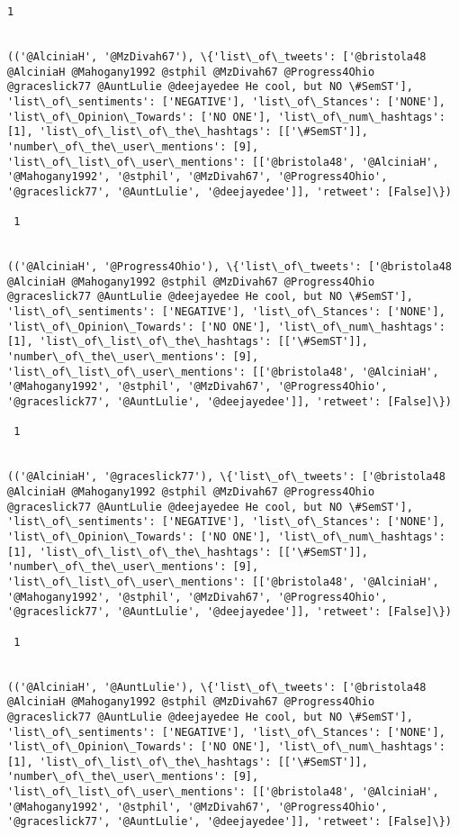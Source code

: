 \documentclass[11pt]{article}
\begin{document}
\begin{Verbatim}[commandchars=\\\{\}]
 1
 

(('@AlciniaH', '@MzDivah67'), \{'list\_of\_tweets': ['@bristola48 @AlciniaH @Mahogany1992 @stphil @MzDivah67 @Progress4Ohio @graceslick77 @AuntLulie @deejayedee He cool, but NO \#SemST'], 'list\_of\_sentiments': ['NEGATIVE'], 'list\_of\_Stances': ['NONE'], 'list\_of\_Opinion\_Towards': ['NO ONE'], 'list\_of\_num\_hashtags': [1], 'list\_of\_list\_of\_the\_hashtags': [['\#SemST']], 'number\_of\_the\_user\_mentions': [9], 'list\_of\_list\_of\_user\_mentions': [['@bristola48', '@AlciniaH', '@Mahogany1992', '@stphil', '@MzDivah67', '@Progress4Ohio', '@graceslick77', '@AuntLulie', '@deejayedee']], 'retweet': [False]\})

 1
 

(('@AlciniaH', '@Progress4Ohio'), \{'list\_of\_tweets': ['@bristola48 @AlciniaH @Mahogany1992 @stphil @MzDivah67 @Progress4Ohio @graceslick77 @AuntLulie @deejayedee He cool, but NO \#SemST'], 'list\_of\_sentiments': ['NEGATIVE'], 'list\_of\_Stances': ['NONE'], 'list\_of\_Opinion\_Towards': ['NO ONE'], 'list\_of\_num\_hashtags': [1], 'list\_of\_list\_of\_the\_hashtags': [['\#SemST']], 'number\_of\_the\_user\_mentions': [9], 'list\_of\_list\_of\_user\_mentions': [['@bristola48', '@AlciniaH', '@Mahogany1992', '@stphil', '@MzDivah67', '@Progress4Ohio', '@graceslick77', '@AuntLulie', '@deejayedee']], 'retweet': [False]\})

 1
 

(('@AlciniaH', '@graceslick77'), \{'list\_of\_tweets': ['@bristola48 @AlciniaH @Mahogany1992 @stphil @MzDivah67 @Progress4Ohio @graceslick77 @AuntLulie @deejayedee He cool, but NO \#SemST'], 'list\_of\_sentiments': ['NEGATIVE'], 'list\_of\_Stances': ['NONE'], 'list\_of\_Opinion\_Towards': ['NO ONE'], 'list\_of\_num\_hashtags': [1], 'list\_of\_list\_of\_the\_hashtags': [['\#SemST']], 'number\_of\_the\_user\_mentions': [9], 'list\_of\_list\_of\_user\_mentions': [['@bristola48', '@AlciniaH', '@Mahogany1992', '@stphil', '@MzDivah67', '@Progress4Ohio', '@graceslick77', '@AuntLulie', '@deejayedee']], 'retweet': [False]\})

 1
 

(('@AlciniaH', '@AuntLulie'), \{'list\_of\_tweets': ['@bristola48 @AlciniaH @Mahogany1992 @stphil @MzDivah67 @Progress4Ohio @graceslick77 @AuntLulie @deejayedee He cool, but NO \#SemST'], 'list\_of\_sentiments': ['NEGATIVE'], 'list\_of\_Stances': ['NONE'], 'list\_of\_Opinion\_Towards': ['NO ONE'], 'list\_of\_num\_hashtags': [1], 'list\_of\_list\_of\_the\_hashtags': [['\#SemST']], 'number\_of\_the\_user\_mentions': [9], 'list\_of\_list\_of\_user\_mentions': [['@bristola48', '@AlciniaH', '@Mahogany1992', '@stphil', '@MzDivah67', '@Progress4Ohio', '@graceslick77', '@AuntLulie', '@deejayedee']], 'retweet': [False]\})


\end{Verbatim}
\end{document}
